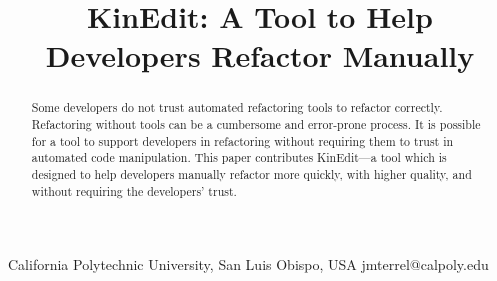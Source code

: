 \documentclass{sigplanconf}
\begin{document}
\setlength{\pdfpageheight}{\paperheight}
\setlength{\pdfpagewidth}{\paperwidth}




\permissiontopublish             %


\newcommand{\pname}{KinEdit}

\title{\pname{}: A Tool to Help Developers Refactor Manually}

           {California Polytechnic University, San Luis Obispo, USA}
           {jmterrel@calpoly.edu}

\maketitle

\begin{abstract}
Some developers do not trust automated refactoring tools to refactor correctly.
Refactoring without tools can be a cumbersome and error-prone process.
It is possible for a tool to support developers in refactoring without
requiring them to trust in automated code manipulation.
This paper contributes \pname{}---a tool which is designed to help developers
manually refactor more quickly, with higher quality,
and without requiring the developers' trust.
\end{abstract}

\end{document}
